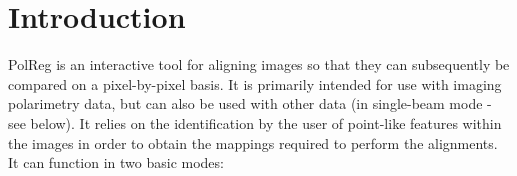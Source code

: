  \newpage
 \begin{latexonly}
   \setlength{\parskip}{0mm}
   \latexonlytoc
   \setlength{\parskip}{\medskipamount}
   \markright{\stardocname}
 \end{latexonly}
\newpage
\renewcommand{\thepage}{\arabic{page}}
\setcounter{page}{1}

\section {Introduction}
PolReg is an interactive tool for aligning images so that they can
subsequently be compared on a pixel-by-pixel basis. It is primarily
intended for use with imaging polarimetry data, but can also be used with
other data (in single-beam mode - see below). It relies on the
identification by the user of point-like features within the images in
order to obtain the mappings required to perform the alignments. It can
function in two basic modes:

